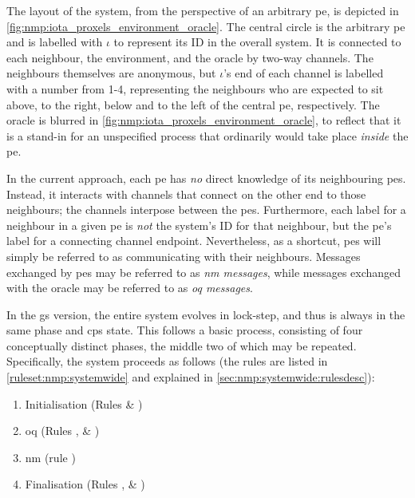 The layout of the system, from the perspective of an arbitrary \gls{pe}, is depicted in \cref{fig:nmp:iota_proxels_environment_oracle}.  The central circle is the arbitrary \gls{pe} and is labelled with \(\iota\) to represent its ID in the overall system.  It is connected to each neighbour, the environment, and the oracle by two-way channels.  The neighbours themselves are anonymous, but \(\iota\)'s end of each channel is labelled with a number from 1-4, representing the neighbours who are expected to sit above, to the right, below and to the left of the central \gls{pe}, respectively.  The oracle is blurred in \cref{fig:nmp:iota_proxels_environment_oracle}, to reflect that it is a stand-in for an unspecified process that ordinarily would take place \emph{inside} the \gls{pe}.

In the current approach, each \gls{pe} has \emph{no} direct knowledge of its neighbouring \glspl{pe}.  Instead, it interacts with channels that connect on the other end to those neighbours; the channels interpose between the \glspl{pe}.  Furthermore, each label for a neighbour in a given \gls{pe} is \emph{not} the system's ID for that neighbour, but the \gls{pe}'s label for a connecting channel endpoint.  Nevertheless, as a shortcut, \glspl{pe} will simply be referred to as communicating with their neighbours.  Messages exchanged by \glspl{pe} may be referred to as \emph{\gls{nm} messages}, while messages exchanged with the oracle may be referred to as \emph{\gls{oq} messages}.

In the \gls{gs} version, the entire system evolves in lock-step, and thus is always in the same phase and \gls{cps} state.  This follows a basic process, consisting of four conceptually distinct phases, the middle two of which may be repeated.  Specifically, the system proceeds as follows (the rules are listed in \vref{ruleset:nmp:systemwide} and explained in \vref{sec:nmp:systemwide:rulesdesc}):

\begin{enumerate}
    \item\label{enumitem:nmp:init} Initialisation (Rules  \& )
    \item\label{enumitem:nmp:pu} \Gls{oq} (Rules ,  \& )
    \item\label{enumitem:nmp:nm} \Gls{nm} (rule )
    \item\label{enumitem:nmp:final} Finalisation (Rules ,  \& )
\end{enumerate}

